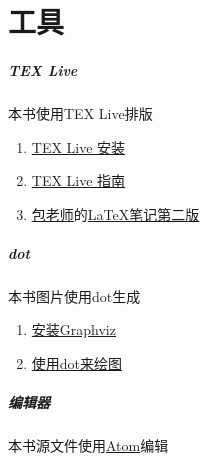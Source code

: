 \chapter{工具}

\paragraph{TEX Live}
本书使用TEX Live排版
\begin{enumerate}
  \item \href{https://wiki.archlinux.org/index.php/TeX_Live_(%E7%AE%80%E4%BD%93%E4%B8%AD%E6%96%87)}{TEX Live 安装}
  \item \href{https://www.tug.org/texlive/doc/texlive-zh-cn/texlive-zh-cn.pdf}{TEX Live 指南}
  \item \href{http://www.dralpha.com/zh/index.htm}{包老师}的\href{http://dralpha.altervista.org/zh/tech/lnotes2.pdf}{LaTeX笔记第二版}
\end{enumerate}

\paragraph{dot}
本书图片使用dot生成
\begin{enumerate}
  \item \href{https://wiki.archlinux.org/index.php/Graphviz}{安装Graphviz}
  \item \href{http://www.jianshu.com/p/5b02445eca1d}{使用dot来绘图}
\end{enumerate}

\paragraph{编辑器}
本书源文件使用\href{https://atom.io/}{Atom}编辑
